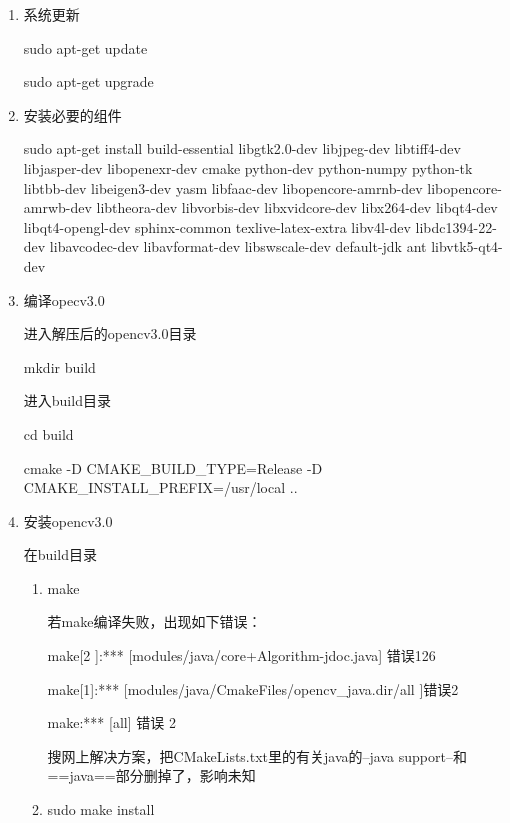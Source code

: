 \documentclass[12pt]{article}
\begin{document}
\begin{enumerate}

\item 系统更新

sudo apt-get update

sudo apt-get upgrade

\item 安装必要的组件

sudo apt-get install build-essential libgtk2.0-dev libjpeg-dev libtiff4-dev libjasper-dev libopenexr-dev cmake python-dev python-numpy python-tk libtbb-dev libeigen3-dev yasm libfaac-dev libopencore-amrnb-dev libopencore-amrwb-dev libtheora-dev libvorbis-dev libxvidcore-dev libx264-dev libqt4-dev libqt4-opengl-dev sphinx-common texlive-latex-extra libv4l-dev libdc1394-22-dev libavcodec-dev libavformat-dev libswscale-dev default-jdk ant libvtk5-qt4-dev

\item 编译opecv3.0

进入解压后的opencv3.0目录

mkdir build

进入build目录

cd build

cmake -D CMAKE\_BUILD\_TYPE=Release -D CMAKE\_INSTALL\_PREFIX=/usr/local ..



\item 安装opencv3.0

在build目录

\begin{enumerate}

\item make  

若make编译失败，出现如下错误：

make[2 ]:*** [modules/java/core+Algorithm-jdoc.java] 错误126

make[1]:*** [modules/java/CmakeFiles/opencv\_java.dir/all ]错误2

make:*** [all] 错误 2

搜网上解决方案，把CMakeLists.txt里的有关java的--java support--和==java==部分删掉了，影响未知

\item sudo make install

\end{enumerate}


\end{enumerate}
\end{document}
